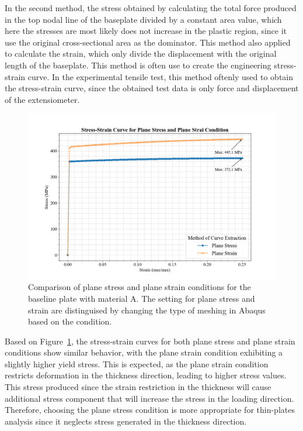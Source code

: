 \documentclass[12pt]{article}
\begin{document}
\hspace{2em}In the second method, the stress obtained by calculating the total force produced in the top nodal line of the baseplate divided by a constant area value, which here
the stresses are most likely does not increase in the plastic region, since it use the original cross-sectional area as the dominator. This method also applied to calculate the strain, which only
divide the displacement with the original length of the baseplate. This method is often use to create the engineering stress-strain curve. In the experimental tensile test, 
this method oftenly used to obtain the stress-strain curve, since the obtained test data is only force and displacement of the extensiometer. 

\begin{figure}[H]
    \centering
    \includegraphics[width=1\textwidth]{visualize_tensileGraph/res/comparison_planeStress_planeStrain.png}
    \caption{Comparison of plane stress and plane strain conditions
    for the baseline plate with material A. The setting for plane stress and strain are distinguised by changing the type of meshing in
    Abaqus based on the condition.} 
    \label{fig:ComparisonDirectCalculated}  
\end{figure}
\hspace{2em}Based on Figure~\ref{fig:ComparisonDirectCalculated}, the stress-strain curves for both plane stress and plane strain conditions show similar behavior, with the plane strain condition exhibiting a slightly higher yield stress.
This is expected, as the plane strain condition restricts deformation in the thickness direction, 
leading to higher stress values. This stress produced since the strain restriction in the thickness
will cause additional stress component that will increase the stress in the loading direction. Therefore, choosing the 
plane stress condition is more appropriate for thin-plates analysis since it neglects stress generated 
in the thickness direction. 
\end{document}
